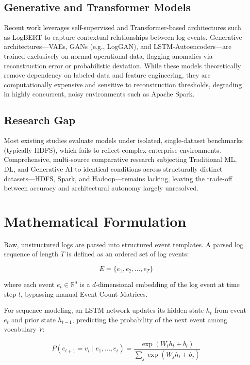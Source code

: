 \documentclass[conference]{IEEEtran}
\begin{document}
\subsection{Generative and Transformer Models}
Recent work leverages self-supervised and Transformer-based architectures such as LogBERT to capture contextual relationships between log events. Generative architectures---VAEs, GANs (e.g., LogGAN), and LSTM-Autoencoders---are trained exclusively on normal operational data, flagging anomalies via reconstruction error or probabilistic deviation. While these models theoretically remove dependency on labeled data and feature engineering, they are computationally expensive and sensitive to reconstruction thresholds, degrading in highly concurrent, noisy environments such as Apache Spark.

\subsection{Research Gap}
Most existing studies evaluate models under isolated, single-dataset benchmarks (typically HDFS), which fails to reflect complex enterprise environments. Comprehensive, multi-source comparative research subjecting Traditional ML, DL, and Generative AI to identical conditions across structurally distinct datasets---HDFS, Spark, and Hadoop---remains lacking, leaving the trade-off between accuracy and architectural autonomy largely unresolved.

\section{Mathematical Formulation}

Raw, unstructured logs are parsed into structured event templates. A parsed log sequence of length $T$ is defined as an ordered set of log events:

\begin{equation}
E = \{e_1, e_2, \dots, e_T\}
\end{equation}

where each event $e_t \in \mathbb{R}^d$ is a $d$-dimensional embedding of the log event at time step $t$, bypassing manual Event Count Matrices.

For sequence modeling, an LSTM network updates its hidden state $h_t$ from event $e_t$ and prior state $h_{t-1}$, predicting the probability of the next event among vocabulary $V$:

\begin{equation}
P(e_{t+1} = v_i \mid e_1,\dots,e_t) = \frac{\exp(W_i h_t + b_i)}{\sum_j \exp(W_j h_t + b_j)}
\end{equation}
\end{document}
